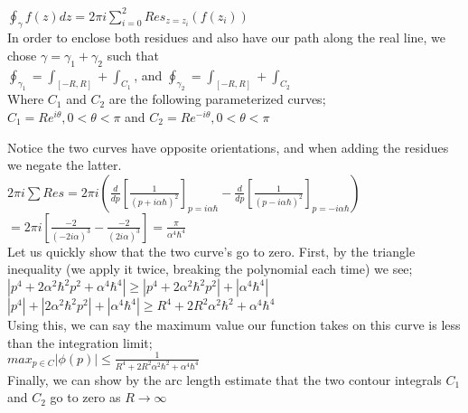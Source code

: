 \documentclass{article}
\begin{document}
${\displaystyle \oint_\gamma }f(z)dz=2\pi i\sum_{i=0}^{2} Res_{z=z_i}(f(z_i))$\\

In order to enclose both residues and also have our path along the real line, we chose $\gamma=\gamma_1+\gamma_2$ such that \\

${\displaystyle \oint_{\gamma_1}}={\displaystyle \int_{[-R,R]}}+{\displaystyle \int_{C_1}}$, and ${\displaystyle \oint_{\gamma_2}}={\displaystyle \int_{[-R,R]}}+{\displaystyle \int_{C_2}}$\\

Where $C_1$ and $C_2$ are the following parameterized curves;\\

$C_1=Re^{i\theta},0<\theta<\pi$ and $C_2=Re^{-i\theta},0<\theta<\pi$

Notice the two curves have opposite orientations, and when adding the residues we negate the latter.\\

$2\pi i\sum Res=2\pi i(\frac{d}{dp}[\frac{1}{(p+i\alpha\hbar)^2}]_{p=i\alpha\hbar}-\frac{d}{dp}[\frac{1}{(p-i\alpha\hbar)^2}]_{p=-i\alpha\hbar})$\\

$=2\pi i[\frac{-2}{(-2i\alpha)^3}-\frac{-2}{(2i\alpha)^3}]=\frac{\pi}{\alpha^4\hbar^4}$\\

Let us quickly show that the two curve's go to zero. First, by the triangle inequality (we apply it twice, breaking the polynomial each time) we see;\\

$|p^4+2\alpha^2\hbar^2p^2+\alpha^4\hbar^4|\geq|p^4+2\alpha^2\hbar^2p^2|+|\alpha^4\hbar^4|$\\

$|p^4|+|2\alpha^2\hbar^2p^2|+|\alpha^4\hbar^4|\geq R^4+2R^2\alpha^2\hbar^2+\alpha^4\hbar^4$\\

Using this, we can say the maximum value our function takes on this curve is less than the integration limit;\\

${max}_{p\in C}|\phi(p)|\leq\frac{1}{R^4+2R^2\alpha^2\hbar^2+\alpha^4\hbar^4}$\\

Finally, we can show by the arc length estimate that the two contour integrals $C_1$ and $C_2$ go to zero as $R\rightarrow\infty$\\
\end{document}
